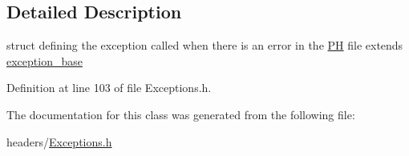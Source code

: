 \subsection{Detailed Description}
struct defining the exception called when there is an error in the \hyperlink{classPH}{P\+H} file extends \hyperlink{structexception__base}{exception\+\_\+base} 

Definition at line 103 of file Exceptions.\+h.



The documentation for this class was generated from the following file\+:\begin{DoxyCompactItemize}
\item 
headers/\hyperlink{Exceptions_8h}{Exceptions.\+h}\end{DoxyCompactItemize}
